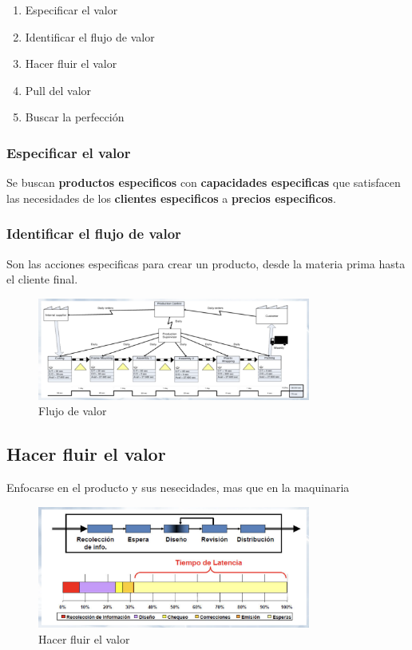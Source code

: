 \begin{enumerate}
    \item Especificar el valor
    \item Identificar el flujo de valor
    \item Hacer fluir el valor
    \item Pull del valor
    \item Buscar la perfección
\end{enumerate}

\subsubsection{Especificar el valor}

Se buscan \textbf{productos especificos} con \textbf{capacidades especificas} que satisfacen las necesidades de los \textbf{clientes especificos} a \textbf{precios especificos}.

\subsubsection{Identificar el flujo de valor}

Son las acciones especificas para crear un producto, desde la materia prima hasta el cliente final.

\begin{figure}[H]
\centering
\includegraphics[width=0.8\textwidth]{IMAGENES/flujo.png}
\caption{Flujo de valor}
\label{fig:flujo_valor}
\end{figure}

\subsection{Hacer fluir el valor}

Enfocarse en el producto y sus nesecidades, mas que en la maquinaria

\begin{figure}[H]
\centering
\includegraphics[width=0.8\textwidth]{IMAGENES/fluir.png}
\caption{Hacer fluir el valor}
\label{fig:flujo_valor}
\end{figure}

